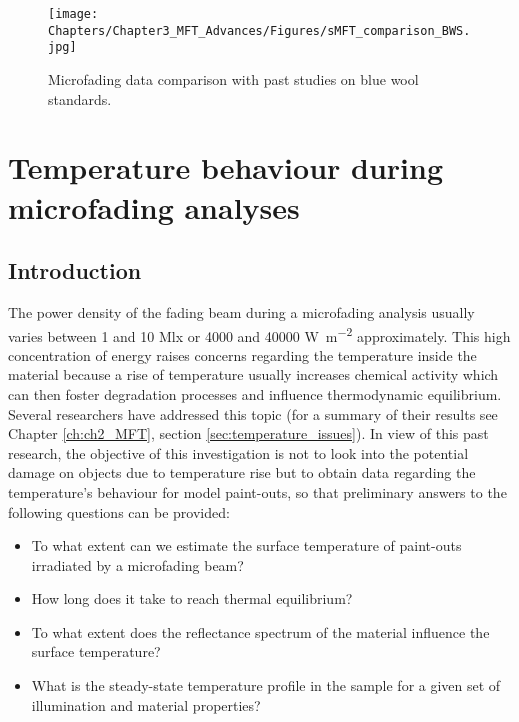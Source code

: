 \begin{figure}
\centering
\texttt{[image: Chapters/Chapter3\_MFT\_Advances/Figures/sMFT\_comparison\_BWS.jpg]}
\caption[\hspace{0.3cm}Microfading data comparison with past studies on blue wool standards.]{Microfading data comparison with past studies on blue wool standards.}
\label{fig:sMFT_BWS_comparison_past-studies}
\end{figure}


\newpage

\section{Temperature behaviour during microfading analyses}
\label{sec:MFT-Temp}

\subsection{Introduction}

The power density of the fading beam during a microfading analysis usually varies between 1 and 10 \unit{\mega\lux} or 4000 and 40000 \unit{\watt\per\square\metre} approximately. This high concentration of energy raises concerns regarding the temperature inside the material because a rise of temperature usually increases chemical activity which can then foster degradation processes and influence thermodynamic equilibrium. Several researchers have addressed this topic (for a summary of their results see Chapter \ref{ch:ch2_MFT}, section \ref{sec:temperature_issues}). In view of this past research, the objective of this investigation is not to look into the potential damage on objects due to temperature rise but to obtain data regarding the temperature's behaviour for model paint-outs, so that preliminary answers to the following questions can be provided:

\begin{itemize}
    \item To what extent can we estimate the surface temperature of paint-outs irradiated by a microfading beam? 
    \item How long does it take to reach thermal equilibrium?
    \item To what extent does the reflectance spectrum of the material influence the surface temperature?
    \item What is the steady-state temperature profile in the sample for a given set of illumination and material properties?
\end{itemize}

